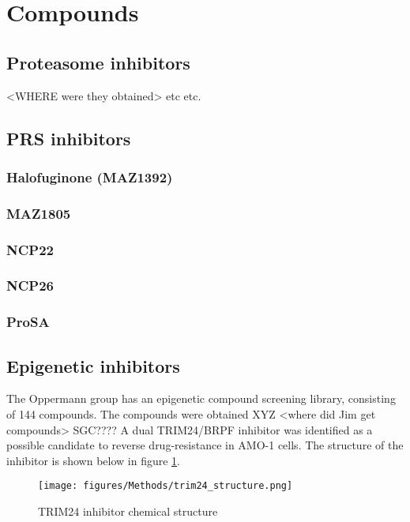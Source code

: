 \section{Compounds}

\subsection{Proteasome inhibitors}
<WHERE were they obtained> etc etc.

\subsection{PRS inhibitors}

\subsubsection{Halofuginone (MAZ1392)}

\subsubsection{MAZ1805}

\subsubsection{NCP22}

\subsubsection{NCP26}

\subsubsection{ProSA}

\subsection{Epigenetic inhibitors}
The Oppermann group has an epigenetic compound screening library, consisting of 144 compounds.
The compounds were obtained XYZ <where did Jim get compounds> SGC????
A dual TRIM24/BRPF inhibitor was identified as a possible candidate to reverse drug-resistance in AMO-1 cells.
The structure of the inhibitor is shown below in figure \ref{fig:trim24_structure}.

\begin{figure}[htb]
\centering
\texttt{[image: figures/Methods/trim24\_structure.png]}
\caption[TRIM24i structure]{TRIM24 inhibitor chemical structure}
\label{fig:trim24_structure}
\end{figure}


